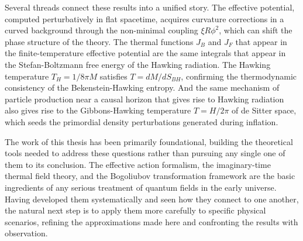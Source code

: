 Several threads connect these results into a unified story. The
effective potential, computed perturbatively in flat spacetime, acquires
curvature corrections in a curved background through the non-minimal
coupling $\xi R\phi^2$, which can shift the phase structure of the
theory. The thermal functions $J_B$ and $J_F$ that appear in the
finite-temperature effective potential are the same integrals that
appear in the Stefan-Boltzmann free energy of the Hawking radiation.
The Hawking temperature $T_H = 1/8\pi M$ satisfies $T = dM/dS_{BH}$,
confirming the thermodynamic consistency of the Bekenstein-Hawking
entropy. And the same mechanism of particle production near a causal
horizon that gives rise to Hawking radiation also gives rise to the
Gibbons-Hawking temperature $T = H/2\pi$ of de Sitter space, which
seeds the primordial density perturbations generated during inflation.

The work of this thesis has been primarily foundational, building the
theoretical tools needed to address these questions rather than
pursuing any single one of them to its conclusion. The effective action
formalism, the imaginary-time thermal field theory, and the Bogoliubov
transformation framework are the basic ingredients of any serious
treatment of quantum fields in the early universe. Having developed
them systematically and seen how they connect to one another, the
natural next step is to apply them more carefully to specific physical
scenarios, refining the approximations made here and confronting the
results with observation.
